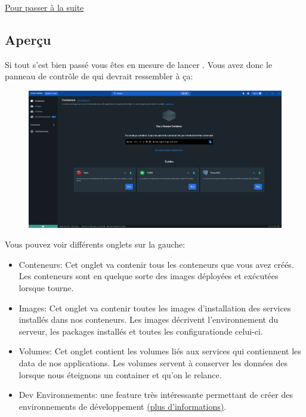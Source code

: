 \documentclass[internal]{nhitec_design}
\begin{document}
        \hyperref[sec:suite]{Pour passer à la suite}

\newpage

    \subsection[Aperçu]{Aperçu\label{sec:suite}}

        Si tout s'est bien passé vous êtes en mesure de lancer \dockerdesktop{}. 
        Vous avez donc le panneau de contrôle de \dockerdesktop{} qui devrait ressembler à ça:\\
        
        \begin{figure}[h]
            \centering
            \includegraphics[scale=0.25]{Images_formation/PanelDocker.pdf}
        \end{figure}

        Vous pouvez voir différents onglets sur la gauche:

        \begin{itemize}
            \item Conteneurs: Cet onglet va contenir tous les conteneurs que vous avez créés. Les conteneurs sont en quelque sorte des images déployées et exécutées lorsque \docker{} tourne.\vspace*{0.5cm}
            \item Images: Cet onglet va contenir toutes les images d'installation des services installés dans nos conteneurs. Les images décrivent l'environnement du serveur, les packages installés et toutes les configurationde celui-ci.\vspace*{0.5cm}
            \item Volumes: Cet onglet contient les volumes liés aux services qui contiennent les data de nos applications. Les volumes servent à conserver les données des \db lorsque nous éteignons un container et qu'on le relance.\vspace*{0.5cm}
            \item Dev Environnements: une feature très intéressante permettant de créer des environnements de développement \footnotesize{\href{https://docs.docker.com/desktop/dev-environments/}{(plus d'informations)}}.
        \end{itemize}
\end{document}
